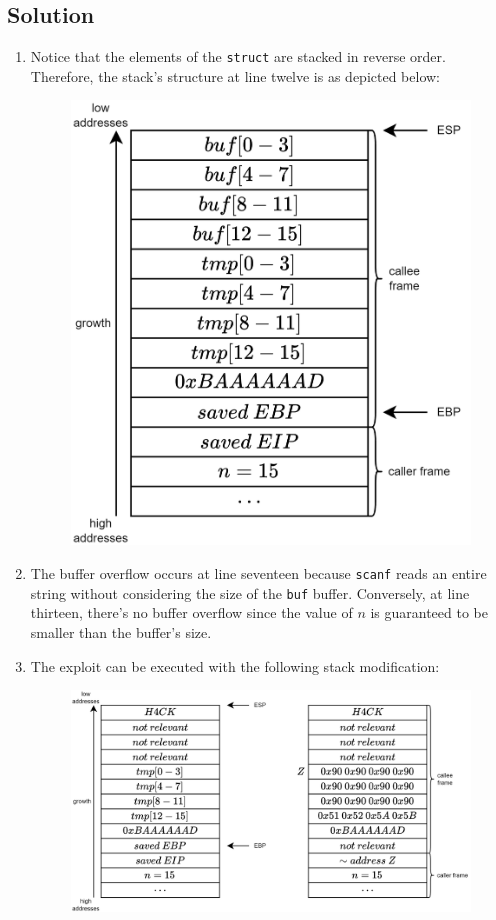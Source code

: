 \subsection*{Solution}
\begin{enumerate}
    \item Notice that the elements of the \texttt{struct} are stacked in reverse order. 
        Therefore, the stack's structure at line twelve is as depicted below:
        \begin{figure}[H]
            \centering
            \includegraphics[width=0.5\linewidth]{images/stack3.png}
        \end{figure}
    \item The buffer overflow occurs at line seventeen because \texttt{scanf} reads an entire string without considering the size of the \texttt{buf} buffer. 
        Conversely, at line thirteen, there's no buffer overflow since the value of $n$ is guaranteed to be smaller than the buffer's size.
    \item The exploit can be executed with the following stack modification:
        \begin{figure}[H]
            \centering
            \includegraphics[width=0.75\linewidth]{images/stack4.png}
        \end{figure}

\end{enumerate}
